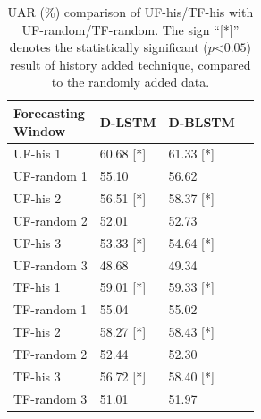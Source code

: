\begin{table}[h]
\centering
\caption{ UAR (\%) comparison of UF-his/TF-his with UF-random/TF-random. The sign ``[*]'' denotes the  statistically  significant ($p$\textless$0.05$) result of history added technique, compared to the randomly added data. }
\begin{tabular}{llll}
\hline
\makecell{\textbf{Forecasting}\\\textbf{Window}}  & \textbf{D-LSTM} & \textbf{D-BLSTM}\\
\hline
\hline
UF-his 1 & 60.68 [*] & 61.33 [*] \\
UF-random 1 & 55.10 & 56.62 \\
\hline
UF-his 2 & 56.51 [*] & 58.37 [*] \\
UF-random 2 & 52.01 & 52.73 \\
\hline
UF-his 3 & 53.33 [*] & 54.64 [*] \\
UF-random 3 & 48.68 & 49.34 \\
\hline
\hline
TF-his 1 & 59.01 [*] & 59.33 [*] \\
TF-random 1 & 55.04 & 55.02 \\
\hline
TF-his 2 & 58.27 [*] & 58.43 [*] \\
TF-random 2 & 52.44 & 52.30 \\
\hline
TF-his 3 & 56.72  [*] & 58.40 [*] \\
TF-random 3 & 51.01 & 51.97 \\
\hline
\end{tabular}
\label{table:noise}
\end{table}




